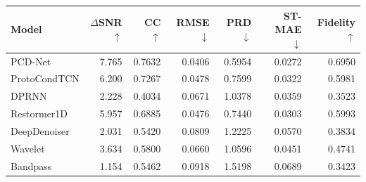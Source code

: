 \begin{tabular}{lrrrrrr}
\toprule
Model & $\Delta$SNR $\uparrow$ & CC $\uparrow$ & RMSE $\downarrow$ & PRD $\downarrow$ & ST-MAE $\downarrow$ & Fidelity $\uparrow$ \\
\midrule
PCD-Net & 7.765 & 0.7632 & 0.0406 & 0.5954 & 0.0272 & 0.6950 \\
ProtoCondTCN & 6.200 & 0.7267 & 0.0478 & 0.7599 & 0.0322 & 0.5981 \\
DPRNN & 2.228 & 0.4034 & 0.0671 & 1.0378 & 0.0359 & 0.3523 \\
Restormer1D & 5.957 & 0.6885 & 0.0476 & 0.7440 & 0.0303 & 0.5993 \\
DeepDenoiser & 2.031 & 0.5420 & 0.0809 & 1.2225 & 0.0570 & 0.3834 \\
Wavelet & 3.634 & 0.5800 & 0.0660 & 1.0596 & 0.0451 & 0.4741 \\
Bandpass & 1.154 & 0.5462 & 0.0918 & 1.5198 & 0.0689 & 0.3423 \\
\bottomrule
\end{tabular}
